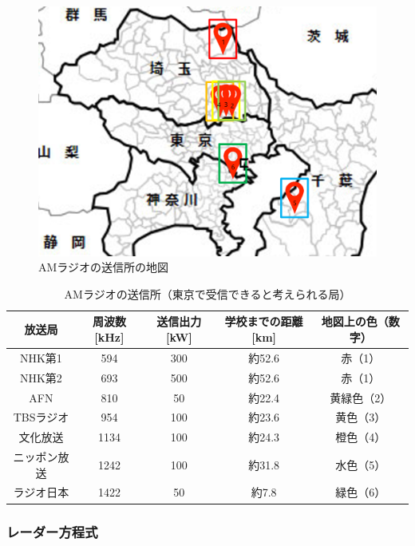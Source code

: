 \documentclass[report.tex]{subfiles}
\begin{document}
\begin{figure}[H]
	\centering
	\includegraphics[width=15cm]{use/map.png}
	\caption{AMラジオの送信所の地図}
	\label{fig:map}
\end{figure}

\begin{table}[H]
	\centering
	\caption{AMラジオの送信所（東京で受信できると考えられる局）}
	\label{tab:zyushin}
	\begin{tabular}{ccccc} \hline
		放送局    & 周波数[kHz] & 送信出力[kW] & 学校までの距離[km] & 地図上の色（数字） \\ \hline
		NHK第1  & 594      & 300      & 約52.6       & 赤（1）      \\
		NHK第2  & 693      & 500      & 約52.6       & 赤（1）      \\
		AFN    & 810      & 50       & 約22.4       & 黄緑色（2）    \\
		TBSラジオ & 954      & 100      & 約23.6       & 黄色（3）     \\
		文化放送   & 1134     & 100      & 約24.3       & 橙色（4）     \\
		ニッポン放送 & 1242     & 100      & 約31.8       & 水色（5）     \\
		ラジオ日本  & 1422     & 50       & 約7.8        & 緑色（6）     \\ \hline
	\end{tabular}
\end{table}

\subsubsection{レーダー方程式}
\end{document}
